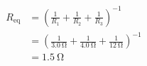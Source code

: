 \documentclass[answers]{exam}
\begin{document}
\begin{questions}
{\begin{minipage}{9cm}
\vspace{1em}

\begin{align*}
    R_\mathrm{eq} &= \left(\frac{1}{R_1} + \frac{1}{R_2} + \frac{1}{R_3}\right)^{-1} \\[1ex]
    &= \left(\frac{1}{\SI{3.0}{\ohm}} + \frac{1}{\SI{4.0}{\ohm}} + \frac{1}{\SI{12}{\ohm}}\right)^{-1} \\[1ex]
    &= \boxed{\SI{1.5}{\ohm}}
\end{align*}

\vspace{1em}
\end{minipage}
}






\end{questions}
\end{document}
